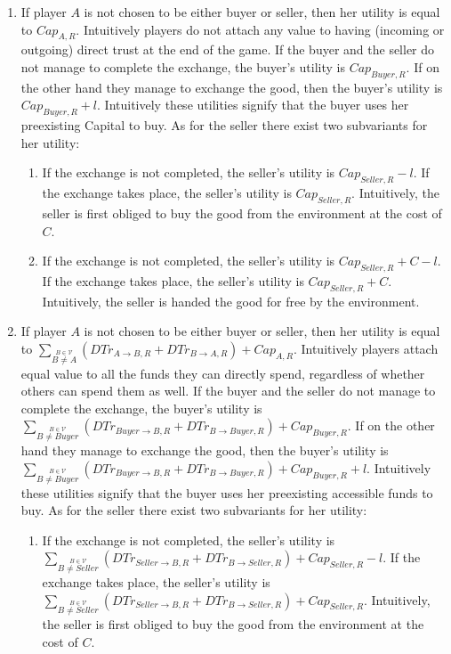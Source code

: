   \begin{enumerate}
    \item If player $A$ is not chosen to be either buyer or seller, then her utility is equal to $Cap_{A, R}$. Intuitively
    players do not attach any value to having (incoming or outgoing) direct trust at the end of the game. If the buyer and the
    seller do not manage to complete the exchange, the buyer's utility is $Cap_{Buyer, R}$. If on the other hand they manage
    to exchange the good, then the buyer's utility is $Cap_{Buyer, R} + l$. Intuitively these utilities signify that the buyer
    uses her preexisting Capital to buy. As for the seller there exist two subvariants for her utility:
    \begin{enumerate}
      \item If the exchange is not completed, the seller's utility is $Cap_{Seller, R} - l$. If the exchange takes place, the
      seller's utility is $Cap_{Seller, R}$. Intuitively, the seller is first obliged to buy the good from the environment at
      the cost of $C$.

      \item If the exchange is not completed, the seller's utility is $Cap_{Seller, R} + C - l$. If the exchange takes place, the
      seller's utility is $Cap_{Seller, R} + C$. Intuitively, the seller is handed the good for free by the environment.
    \end{enumerate}
    
    \item If player $A$ is not chosen to be either buyer or seller, then her utility is equal to $\sum\limits_{\overset{B \in
    \mathcal{V}}{B \neq A}}\left(DTr_{A \rightarrow B, R} + DTr_{B \rightarrow A, R}\right) + Cap_{A, R}$. Intuitively players
    attach equal value to all the funds they can directly spend, regardless of whether others can spend them as well. If the
    buyer and the seller do not manage to complete the exchange, the buyer's utility is $\sum\limits_{\overset{B \in
    \mathcal{V}}{B \neq Buyer}}\left(DTr_{Buyer \rightarrow B, R} + DTr_{B \rightarrow Buyer, R}\right) + Cap_{Buyer, R}$. If
    on the other hand they manage to exchange the good, then the buyer's utility is $\sum\limits_{\overset{B \in
    \mathcal{V}}{B \neq Buyer}}\left(DTr_{Buyer \rightarrow B, R} + DTr_{B \rightarrow Buyer, R}\right) + Cap_{Buyer, R} + l$.
    Intuitively these utilities signify that the buyer uses her preexisting accessible funds to buy. As for the seller there
    exist two subvariants for her utility:
    \begin{enumerate}
      \item If the exchange is not completed, the seller's utility is $\sum\limits_{\overset{B \in \mathcal{V}}{B \neq
      Seller}}\left(DTr_{Seller \rightarrow B, R} + DTr_{B \rightarrow Seller, R}\right) + Cap_{Seller, R} - l$. If the
      exchange takes place, the seller's utility is $\sum\limits_{\overset{B \in \mathcal{V}}{B \neq Seller}}\left(DTr_{Seller
      \rightarrow B, R} + DTr_{B \rightarrow Seller, R}\right) + Cap_{Seller, R}$. Intuitively, the seller is first obliged to
      buy the good from the environment at the cost of $C$.


\end{enumerate}
\end{enumerate}
